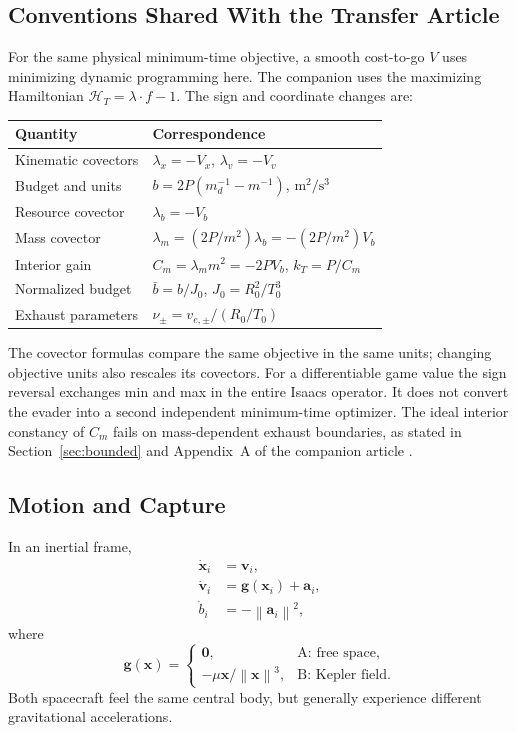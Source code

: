 \documentclass[journal,a4paper]{IEEEtran}
\newcommand{\norm}[1]{\left\|#1\right\|}
\begin{document}
\subsection{Conventions Shared With the Transfer Article}
For the same physical minimum-time objective, a smooth cost-to-go $V$
uses minimizing dynamic programming here. The companion uses the
maximizing Hamiltonian $\mathcal H_T=\lambda\cdot f-1$. The sign and
coordinate changes are:
\begin{center}\small
\begin{tabular}{@{}p{}p{}@{}}\toprule
Quantity & Correspondence\\\midrule
Kinematic covectors & $\lambda_x=-V_x$, $\lambda_v=-V_v$\\
Budget and units & $b=2P(m_d^{-1}-m^{-1})$, $\mathrm{m^2/s^3}$\\
Resource covector & $\lambda_b=-V_b$\\
Mass covector & $\lambda_m=(2P/m^2)\lambda_b=-(2P/m^2)V_b$\\
Interior gain & $C_m=\lambda_m m^2=-2PV_b$, $k_T=P/C_m$\\
Normalized budget & $\bar b=b/J_0$, $J_0=R_0^2/T_0^3$\\
Exhaust parameters & $\nu_\pm=v_{e,\pm}/(R_0/T_0)$\\\bottomrule
\end{tabular}
\end{center}
The covector formulas compare the same objective in the same units;
changing objective units also rescales its covectors. For a differentiable
game value the sign reversal exchanges min and max in the entire Isaacs
operator. It does not convert the evader into a second independent
minimum-time optimizer. The ideal interior constancy of $C_m$ fails
on mass-dependent exhaust boundaries, as stated in
Section~\ref{sec:bounded} and Appendix~A of the companion article
\cite{OlsinaCompanion}.

\subsection{Motion and Capture}
In an inertial frame,
\begin{subequations}\label{eq:fullstate}
\begin{align}
 \dot{\mathbf x}_i&=\mathbf v_i,\\
 \dot{\mathbf v}_i&=\mathbf g(\mathbf x_i)+\mathbf a_i,\\
 \dot b_i&=-\norm{\mathbf a_i}^2,
\end{align}
\end{subequations}
where
\begin{equation}
 \mathbf g(\mathbf x)=
 \begin{cases}
 \mathbf0,&\text{A: free space},\\
 -\mu\mathbf x/\norm{\mathbf x}^3,&\text{B: Kepler field}.
 \end{cases}
 \label{eq:gravity}
\end{equation}
Both spacecraft feel the same central body, but generally experience different gravitational accelerations.
\end{document}
